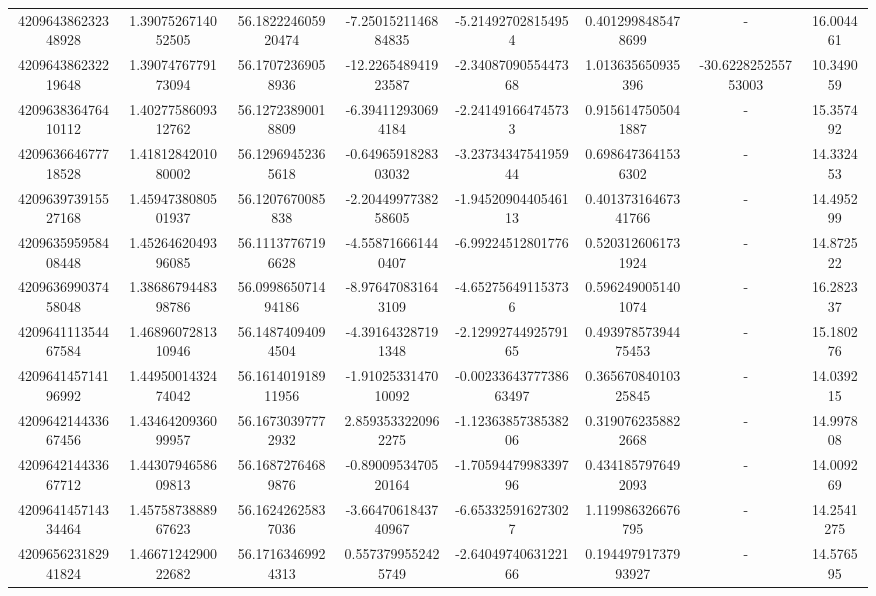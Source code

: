\documentclass{article}
\begin{document}
\begin{landscape}
\begin{longtable}[c]{S[table-format=18.0]S[table-format=2.15]S[table-format=2.15]S[table-format=-2.17]S[table-format=-2.16]S[table-format=-2.16]S[table-format=-3.16]S[table-format=2.7]}
420964386232348928 & 1.3907526714052505 & 56.182224605920474 & -7.2501521146884835  & -5.214927028154954     & 0.4012998485478699  & {-}                  & 16.004461  \\
420964386232219648 & 1.3907476779173094 & 56.17072369058936  & -12.226548941923587  & -2.3408709055447368    & 1.013635650935396   & -30.622825255753003 & 10.349059  \\
420963836476410112 & 1.4027758609312762 & 56.12723890018809  & -6.394112930694184   & -2.241491664745733     & 0.9156147505041887  & {-}                  & 15.357492  \\
420963664677718528 & 1.4181284201080002 & 56.12969452365618  & -0.6496591828303032  & -3.2373434754195944    & 0.6986473641536302  & {-}                  & 14.332453  \\
420963973915527168 & 1.4594738080501937 & 56.1207670085838   & -2.2044997738258605  & -1.9452090440546113    & 0.40137316467341766 & {-}                  & 14.495299  \\
420963595958408448 & 1.4526462049396085 & 56.11137767196628  & -4.558716661440407   & -6.99224512801776      & 0.5203126061731924  & {-}                  & 14.872522  \\
420963699037458048 & 1.3868679448398786 & 56.099865071494186 & -8.976470831643109   & -4.652756491153736     & 0.5962490051401074  & {-}                  & 16.282337  \\
420964111354467584 & 1.4689607281310946 & 56.14874094094504  & -4.391643287191348   & -2.1299274492579165    & 0.49397857394475453 & {-}                  & 15.180276  \\
420964145714196992 & 1.4495001432474042 & 56.161401918911956 & -1.9102533147010092  & -0.0023364377738663497 & 0.36567084010325845 & {-}                  & 14.039215  \\
420964214433667456 & 1.4346420936099957 & 56.16730397772932  & 2.8593533220962275   & -1.1236385738538206    & 0.3190762358822668  & {-}                  & 14.997808  \\
420964214433667712 & 1.4430794658609813 & 56.16872764689876  & -0.8900953470520164  & -1.7059447998339796    & 0.4341857976492093  & {-}                  & 14.009269  \\
420964145714334464 & 1.4575873888967623 & 56.16242625837036  & -3.6647061843740967  & -6.653325916273027     & 1.119986326676795   & {-}                  & 14.2541275 \\
420965623182941824 & 1.4667124290022682 & 56.17163469924313  & 0.5573799552425749   & -2.6404974063122166    & 0.19449791737993927 & {-}                  & 14.576595  \\

\end{longtable}
\end{landscape}
\end{document}
